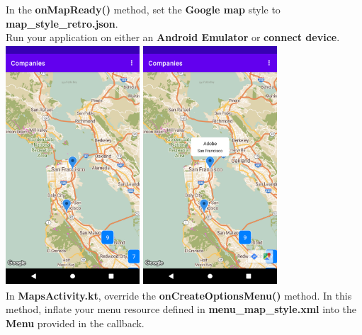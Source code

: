 \documentclass{article}
\begin{document}
In the \textbf{onMapReady()} method, set the \textbf{Google map} style to \textbf{map\_style\_retro.json}. \\

Run your application on either an \textbf{Android Emulator} or \textbf{connect device}. \\ 

\includegraphics[width=5cm, height=9cm]{../../resources/img/practicals/05-companies-2.png} 
\includegraphics[width=5cm, height=9cm]{../../resources/img/practicals/05-companies-3.png} \\

In \textbf{MapsActivity.kt}, override the \textbf{onCreateOptionsMenu()} method. In this method, inflate your menu resource defined in \textbf{menu\_map\_style.xml} into the \textbf{Menu} provided in the callback. \\
\end{document}
